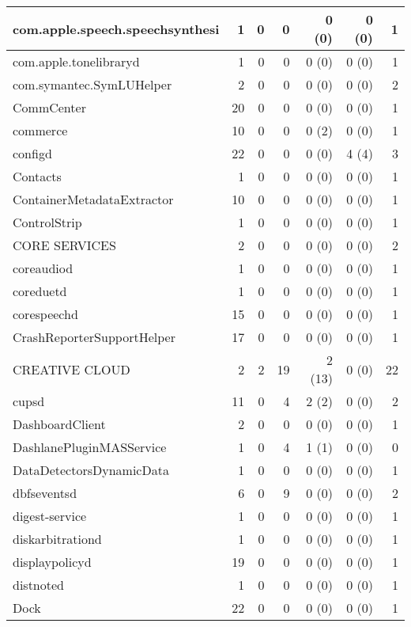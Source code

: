 \begin{adjustwidth}{-2in}{}
\begin{scriptsize}
\begin{longtable}[l]{ l | r | r | r | r | r | r }
    com.apple.speech.speechsynthesi &  1 &  0 &  0 &  0 (0) &  0 (0) &  1 \\ \hline
    com.apple.tonelibraryd & 1 &  0 &  0 &  0 (0) &  0 (0) &  1 \\ \hline
    com.symantec.SymLUHelper & 2 &  0 &  0 &  0 (0) &  0 (0) &  2 \\ \hline
    CommCenter &  20 &  0 &  0 &  0 (0) &  0 (0) &  1 \\ \hline
    commerce &  10 &  0 &  0 &  0 (2) &  0 (0) &  1 \\ \hline
    configd & 22 &  0 &  0 &  0 (0) &  4 (4) &  3 \\ \hline
    Contacts & 1 &  0 &  0 &  0 (0) &  0 (0) &  1 \\ \hline
    ContainerMetadataExtractor &  10 &  0 &  0 &  0 (0) &  0 (0) &  1 \\ \hline
    ControlStrip & 1 &  0 &  0 &  0 (0) &  0 (0) &  1 \\ \hline
    CORE SERVICES &  2 &  0 &  0 &  0 (0) &  0 (0) &  2 \\ \hline
    coreaudiod & 1 &  0 &  0 &  0 (0) &  0 (0) &  1 \\ \hline
    coreduetd &  1 &  0 &  0 &  0 (0) &  0 (0) &  1 \\ \hline
    corespeechd & 15 &  0 &  0 &  0 (0) &  0 (0) &  1 \\ \hline
    CrashReporterSupportHelper &  17 &  0 &  0 &  0 (0) &  0 (0) &  1 \\ \hline
    CREATIVE CLOUD & 2 &  2 & 19 & 2 (13) &  0 (0) & 22 \\ \hline
    cupsd & 11 &  0 &  4 &  2 (2) &  0 (0) &  2 \\ \hline
    DashboardClient &  2 &  0 &  0 &  0 (0) &  0 (0) &  1 \\ \hline
    DashlanePluginMASService & 1 &  0 &  4 &  1 (1) &  0 (0) &  0 \\ \hline
    DataDetectorsDynamicData & 1 &  0 &  0 &  0 (0) &  0 (0) &  1 \\ \hline
    dbfseventsd &  6 &  0 &  9 &  0 (0) &  0 (0) &  2 \\ \hline
    digest-service & 1 &  0 &  0 &  0 (0) &  0 (0) &  1 \\ \hline
    diskarbitrationd & 1 &  0 &  0 &  0 (0) &  0 (0) &  1 \\ \hline
    displaypolicyd &  19 &  0 &  0 &  0 (0) &  0 (0) &  1 \\ \hline
    distnoted &  1 &  0 &  0 &  0 (0) &  0 (0) &  1 \\ \hline
    Dock &  22 &  0 &  0 &  0 (0) &  0 (0) &  1 \\ \hline

\end{longtable}
\end{scriptsize}
\end{adjustwidth}
